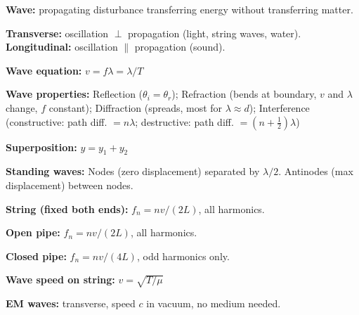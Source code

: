 \begin{summarybox}
\textbf{Wave:} propagating disturbance transferring
energy without transferring matter.

\textbf{Transverse:} oscillation $\perp$ propagation
(light, string waves, water).
\textbf{Longitudinal:} oscillation $\parallel$
propagation (sound).

\textbf{Wave equation:} $v = f\lambda = \lambda/T$

\textbf{Wave properties:}
Reflection ($\theta_i = \theta_r$);
Refraction (bends at boundary, $v$ and $\lambda$ change,
$f$ constant);
Diffraction (spreads, most for $\lambda \approx d$);
Interference (constructive: path diff. $= n\lambda$;
destructive: path diff. $= (n+\tfrac{1}{2})\lambda$)

\textbf{Superposition:} $y = y_1 + y_2$

\textbf{Standing waves:}
Nodes (zero displacement) separated by $\lambda/2$.
Antinodes (max displacement) between nodes.

\textbf{String (fixed both ends):}
$f_n = nv/(2L)$, all harmonics.

\textbf{Open pipe:} $f_n = nv/(2L)$, all harmonics.

\textbf{Closed pipe:} $f_n = nv/(4L)$,
odd harmonics only.

\textbf{Wave speed on string:}
$v = \sqrt{T/\mu}$

\textbf{EM waves:} transverse, speed $c$
in vacuum, no medium needed.
\end{summarybox}

